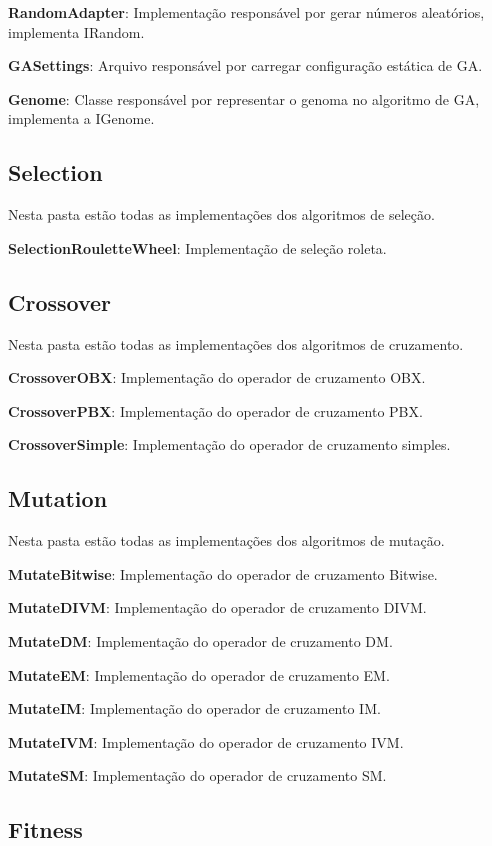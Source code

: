 \textbf{RandomAdapter}: Implementação responsável por gerar números aleatórios, implementa IRandom.

\textbf{GASettings}: Arquivo responsável por carregar configuração estática de GA.

\textbf{Genome}: Classe responsável por representar o genoma no algoritmo de GA, implementa a IGenome.

\subsection{Selection}

Nesta pasta estão todas as implementações dos algoritmos de seleção.

\textbf{SelectionRouletteWheel}: Implementação de seleção roleta.

\subsection{Crossover}

Nesta pasta estão todas as implementações dos algoritmos de cruzamento.

\textbf{CrossoverOBX}: Implementação do operador de cruzamento OBX.

\textbf{CrossoverPBX}: Implementação do operador de cruzamento PBX.

\textbf{CrossoverSimple}:  Implementação do operador de cruzamento simples.

\subsection{Mutation}

Nesta pasta estão todas as implementações dos algoritmos de mutação.

\textbf{MutateBitwise}: Implementação do operador de cruzamento Bitwise.

\textbf{MutateDIVM}: Implementação do operador de cruzamento DIVM.

\textbf{MutateDM}: Implementação do operador de cruzamento DM.

\textbf{MutateEM}: Implementação do operador de cruzamento EM.

\textbf{MutateIM}: Implementação do operador de cruzamento IM.

\textbf{MutateIVM}: Implementação do operador de cruzamento IVM.

\textbf{MutateSM}: Implementação do operador de cruzamento SM.

\subsection{Fitness}

